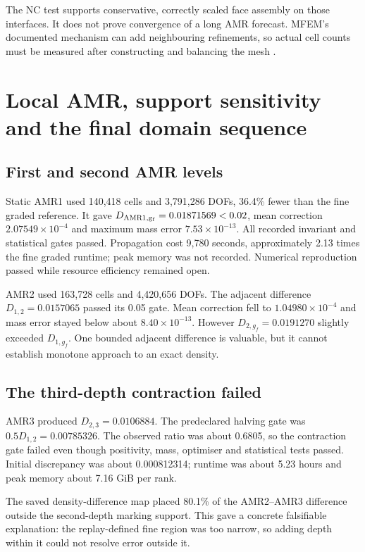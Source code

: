 The NC test supports conservative, correctly scaled face assembly on those interfaces. It does not prove convergence of a long AMR forecast. MFEM's documented  mechanism can add neighbouring refinements, so actual cell counts must be measured after constructing and balancing the mesh \cite{mfemnc}.

\chapter{Local AMR, support sensitivity and the final domain sequence}
\section{First and second AMR levels}
Static AMR1 used 140,418 cells and 3,791,286 DOFs, 36.4\% fewer than the fine graded reference. It gave $D_{\rm AMR1,g_f}=0.01871569<0.02$, mean correction $2.07549\times10^{-4}$ and maximum mass error $7.53\times10^{-13}$. All recorded invariant and statistical gates passed. Propagation cost 9,780 seconds, approximately 2.13 times the fine graded runtime; peak memory was not recorded. Numerical reproduction passed while resource efficiency remained open.

AMR2 used 163,728 cells and 4,420,656 DOFs. The adjacent difference $D_{1,2}=0.0157065$ passed its 0.05 gate. Mean correction fell to $1.04980\times10^{-4}$ and mass error stayed below about $8.40\times10^{-13}$. However $D_{2,g_f}=0.0191270$ slightly exceeded $D_{1,g_f}$. One bounded adjacent difference is valuable, but it cannot establish monotone approach to an exact density.

\section{The third-depth contraction failed}
AMR3 produced $D_{2,3}=0.0106884$. The predeclared halving gate was $0.5D_{1,2}=0.00785326$. The observed ratio was about 0.6805, so the contraction gate failed even though positivity, mass, optimiser and statistical tests passed. Initial discrepancy was about 0.000812314; runtime was about 5.23 hours and peak memory about 7.16 GiB per rank.

The saved density-difference map placed 80.1\% of the AMR2--AMR3 difference outside the second-depth marking support. This gave a concrete falsifiable explanation: the replay-defined fine region was too narrow, so adding depth within it could not resolve error outside it.

